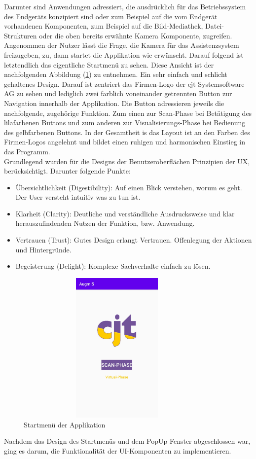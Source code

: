 Darunter sind Anwendungen adressiert, die ausdrücklich für das Betriebssystem des Endgeräts konzipiert sind oder zum Beispiel auf die vom Endgerät vorhandenen Komponenten, 
zum Beispiel auf die Bild-Mediathek, Datei-Strukturen oder die oben bereits erwähnte Kamera Komponente, zugreifen.
\\ 
\linebreak
Angenommen der Nutzer lässt die Frage, die Kamera für das Assistenzsystem freizugeben, zu, dann startet die Applikation wie erwünscht. Darauf folgend ist letztendlich 
das eigentliche Startmenü zu sehen. Diese Ansicht ist der nachfolgenden Abbildung (\ref{pic:startmenu}) zu entnehmen. Ein sehr einfach und schlicht gehaltenes Design. 
Darauf ist zentriert das Firmen-Logo der cjt Systemsoftware AG zu sehen und lediglich zwei farblich voneinander getrennten Button zur Navigation innerhalb der Applikation. 
Die Button adressieren jeweils die nachfolgende, zugehörige Funktion. Zum einen 
zur Scan-Phase bei Betätigung des lilafarbenen Buttons und zum anderen zur Visualisierungs-Phase bei Bedienung des gelbfarbenen Buttons. In der Gesamtheit is das Layout 
ist an den Farben des Firmen-Logos angelehnt und bildet einen ruhigen und harmonischen Einstieg in das Programm. 
\\ 
Grundlegend wurden für die Designs der Benutzeroberflächen Prinzipien der \ac{UX}, berücksichtigt. Darunter folgende Punkte: 
\begin{itemize}
    \item Übersichtlichkeit (Digestibility): Auf einen Blick verstehen, worum es geht. Der User versteht intuitiv was zu tun ist.
    \item Klarheit (Clarity): Deutliche und verständliche Ausdrucksweise und klar herauszufindenden Nutzen der Funktion, bzw. Anwendung.
    \item Vertrauen (Trust): Gutes Design erlangt Vertrauen. Offenlegung der Aktionen und Hintergründe. 
    \item Begeisterung (Delight): Komplexe Sachverhalte einfach zu lösen. 
\end{itemize} 
\begin{figure}[hbt!]
    \centering
    \includegraphics[width=10cm,height=7.5cm,keepaspectratio]{4Umsetzung/Bilder/startmenu.jpg}
    \caption{Startmenü der Applikation}
    \label{pic:startmenu}
\end{figure}
Nachdem das Design des Startmenüs und dem PopUp-Fenster abgeschlossen war, ging es darum, die Funktionalität der UI-Komponenten zu implementieren. 
